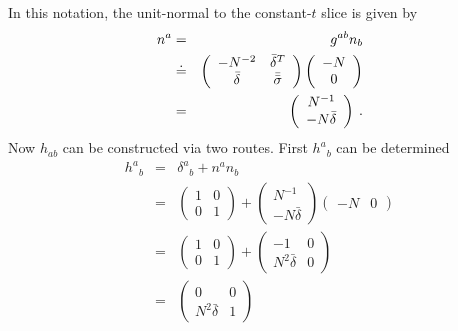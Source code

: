 In this notation, the unit-normal to the constant-$t$ slice is given by
\begin{eqnarray*}
   n^a & = &  g^{ab} n_{b} \\
       & \doteq &
   \left(
     \begin{array}{c c}
        -N^{-2}       & {\bar \delta}^{T} \\
       {\bar \delta}  & {\bar {\bar \sigma}}
     \end{array}
   \right)
%
   \left(
     \begin{array}{c}
       -N \\
       0
     \end{array}
   \right) \\
%
   & = &
   \left(
     \begin{array}{c}
       N^{-1} \\
       -N \bar \delta
     \end{array}
   \right) \eqp
\end{eqnarray*}
Now $h_{ab}$ can be constructed via two routes.  First ${h^{a}}_{b}$ can be
determined
\begin{eqnarray*}
   {h^{a}}_{b} & = &  {\delta^{a}}_{b} + n^{a} n_{b} \\
             & = & \left(
                      \begin{array}{cc}
                         1 & 0 \\
                         0 & 1
                      \end{array}
                   \right) +
                   \left(
                      \begin{array}{c}
                          N^{-1} \\ -N \bar \delta
                      \end{array}
                   \right)
                   \left(
                      \begin{array}{cc}
                         -N & 0
                      \end{array}
                   \right) \\
             & = & \left(
                      \begin{array}{cc}
                         1 & 0 \\
                         0 & 1
                      \end{array}
                   \right) +
                   \left(
                      \begin{array}{cc}
                         -1             & 0 \\
                         N^2 \bar \delta & 0
                      \end{array}
                   \right) \\
             & = & \left(
                      \begin{array}{cc}
                         0               & 0 \\
                         N^2 \bar \delta & 1
                      \end{array}
                   \right)
\end{eqnarray*}
